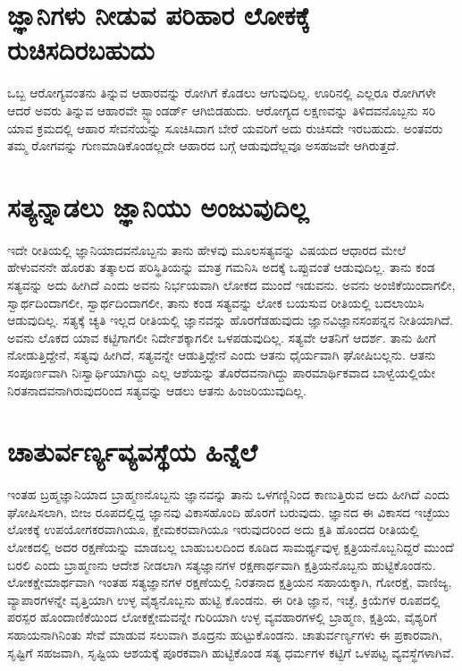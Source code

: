 \section*{ಜ್ಞಾನಿಗಳು ನೀಡುವ ಪರಿಹಾರ ಲೋಕಕ್ಕೆ ರುಚಿಸದಿರಬಹುದು}

ಒಬ್ಬ ಆರೋಗ್ಯವಂತನು ತಿನ್ನುವ ಆಹಾರವನ್ನು ರೋಗಿಗೆ ಕೊಡಲು ಆಗುವುದಿಲ್ಲ. ಊರಿನಲ್ಲಿ ಎಲ್ಲರೂ ರೋಗಿಗಳೇ ಆದರೆ ಅವರು ತಿನ್ನುವ ಆಹಾರವೇ ಸ್ಟ್ಯಾಂಡರ್ಡ್ ಆಗಿಬಿಡಹುದು. ಆರೋಗ್ಯದ ಲಕ್ಷಣವನ್ನು ತಿಳಿದವನೊಬ್ಬನು ಸರಿ ಯಾವ ಕ್ರಮದಲ್ಲಿ ಆಹಾರ ಸೇವನೆಯನ್ನು ಸೂಚಿಸಿದಾಗ ಬೇರೆ ಯವರಿಗೆ ಅದು ರುಚಿಸದೇ ಇರಬಹುದು. ಅಂತವರು ತಮ್ಮ ರೋಗವನ್ನು ಗುಣಮಾಡಿಕೊಂಡಲ್ಲದೇ ಆಹಾರದ ಬಗ್ಗೆ ಆಡುವುದೆಲ್ಲವೂ ಅಸಹಜವೇ ಆಗಿರುತ್ತದೆ.

\section*{ಸತ್ಯನ್ನಾಡಲು ಜ್ಞಾನಿಯು ಅಂಜುವುದಿಲ್ಲ}

ಇದೇ ರೀತಿಯಲ್ಲಿ ಜ್ಞಾನಿಯಾದವನೊಬ್ಬನು ತಾನು ಹೇಳವು ಮೂಲಸತ್ಯವನ್ನು ವಿಷಯದ ಆಧಾರದ ಮೇಲೆ ಹೇಳುವನನೇ ಹೊರತು ತತ್ಕಾಲದ ಪರಿಸ್ಥಿತಿಯನ್ನು ಮಾತ್ರ ಗಮನಿಸಿ ಅದಕ್ಕೆ ಒಪ್ಪುವಂತೆ ಆಡುವುದಿಲ್ಲ. ತಾನು ಕಂಡ ಸತ್ಯವನ್ನು ಅದು ಹೀಗಿದೆ ಎಂದು ಅವನು ನಿರ್ಭಯವಾಗಿ ಲೋಕದ ಮುಂದೆ ಇಡುವನು. ಅವನು ಅಂಜಿಕೆಯಿಂದಾಗಲೀ, ಸ್ವಾರ್ಥದಿಂದಾಗಲೀ, ಸ್ವಾರ್ಥದಿಂದಾಗಲೀ, ತಾನು ಕಂಡ ಸತ್ಯವನ್ನು ಲೋಕ ಬಯಸುವ ರೀತಿಯಲ್ಲಿ ಬದಲಾಯಿಸಿ ಆಡುವುದಿಲ್ಲ. ಸತ್ಯಕ್ಕೆ ಚ್ಯತಿ ಇಲ್ಲದ ರೀತಿಯಲ್ಲಿ ಜ್ಞಾನವನ್ನು ಹೊರಗೆಡಹುವುದು ಜ್ಞಾನವಿಜ್ಞಾನಸಂಪನ್ನನ ನೀತಿಯಾಗಿದೆ. ಅವನು ಲೊಕದ ಯಾವ ಕಟ್ಟಿಗಾಗಲೀ ನಿರ್ದೇಶಕ್ಕಾಗಲೀ ಒಳಪಡುವುದಿಲ್ಲ. ಸತ್ಯವೇ ಆತನಿಗೆ ಆದರ್ಶ. ತಾನು ಹೀಗೆ ನೋಡುತ್ತಿದ್ದೇನೆ, ಸತ್ಯವು ಹೀಗಿದೆ, ಸತ್ಯವನ್ನೇ ಆಡುತ್ತಿದ್ದೇನೆ ಎಂದು ಆತನು ಧೈರ್ಯವಾಗಿ ಘೋಷಿಬಲ್ಲನು. ಆತನು ಸಂಪೂರ್ಣವಾಗಿ ನಿಃಸ್ವಾರ್ಥಿಯಾಗಿದ್ದು ಎಲ್ಲ ಆಶೆಯನ್ನು ತೊರೆದವನಾಗಿದ್ದು ಪಾರಮಾರ್ಥಿಕವಾದ ಬಾಳ್ವೆಯಲ್ಲಿಯೇ ನಿರತನಾದವನಾಗಿರುವುದರಿಂದ ಸತ್ಯವನ್ನು ಆಡಲು ಆತನು ಹಿಂಜರಿಯುವುದಿಲ್ಲ. 

\section*{ಚಾತುರ್ವರ್ಣ್ಯವ್ಯವಸ್ಥೆಯ ಹಿನ್ನೆಲೆ}

ಇಂತಹ ಬ್ರಹ್ಮಜ್ಞಾನಿಯಾದ ಬ್ರಾಹ್ಮಣನೊಬ್ಬನು ಜ್ಞಾನವನ್ನು ತಾನು ಒಳಗಣ್ಣಿನಿಂದ ಕಾಣುತ್ತಿರುವ ಅದು ಹೀಗಿದೆ ಎಂದು ಘೋಷಿಸಲಾಗಿ, ಬೀಜ ರೂಪದಲ್ಲಿದ್ದ ಜ್ಞಾನವು ವಿಕಾಸಹೊಂದಿ ಹೊರಗೆ ಬರುವುದು. ಜ್ಞಾನದ ಈ ವಿಕಾಸದ ಇಚ್ಛೆಯು ಲೋಕಕ್ಕೆ ಉಪಯೋಗಕರವಾಗಿಯೂ, ಕ್ಷೇಮಕರವಾಗಿಯೂ ಇರುವುದರಿಂದ ಅದು ಕ್ಷತಿ ಹೊಂದದ ರೀತಿಯಲ್ಲಿ ಲೋಕದಲ್ಲಿ ಅದರ ರಕ್ಷಣೆಯನ್ನು ಮಾಡಬಲ್ಲ ಬಾಹುಬಲದಿಂದ ಕೂಡಿದ ಸಾಮರ್ಥ್ಯವುಳ್ಳ ಕ್ಷತ್ರಿಯನೊಬ್ಬನಿದ್ದರೆ ಮುಂದೆ ಬರಲಿ ಎಂದು ಬ್ರಾಹ್ಮಣನು ಆದೇಶ ನೀಡಲಾಗಿ ಸತ್ಯಜ್ಞಾನಗಳ ರಕ್ಷಣಾರ್ಥವಾಗಿ ಕ್ಷತ್ರಿಯನೊಬ್ಬನು ಹುಟ್ಟಿಕೊಂಡನು. ಲೋಕಕ್ಷೇಮಾರ್ಥವಾಗಿ ಇಂತಹ ಸತ್ಯಜ್ಞಾನಗಳ ರಕ್ಷಣೆಯಲ್ಲಿ ನಿರತನಾದ ಕ್ಷತ್ರಿಯನ ಸಹಾಯಕ್ಕಾಗಿ, ಗೋರಕ್ಷೆ, ವಾಣಿಜ್ಯ, ವ್ಯಾಪಾರಗಳನ್ನೇ ವೃತ್ತಿಯಾಗಿ ಉಳ್ಳ ವೈಶ್ಯನೊಬ್ಬನು ಹುಟ್ಟಿ ಕೊಂಡನು. ಈ ರೀತಿ ಜ್ಞಾನ, ಇಚ್ಛೆ, ಕ್ರಿಯೆಗಳ ರೂಪದಲ್ಲಿ ಪರಸ್ಪರ ಹೊಂದಾಣಿಕೆಯಿಂದ ಲೋಕಕ್ಷೇಮವನ್ನೇ ಗುರಿಯಾಗಿ ಉಳ್ಳ ವ್ಯವಹಾರಗಳಲ್ಲಿ ಬ್ರಾಹ್ಮಣ, ಕ್ಷತ್ರಿಯ, ವೈಶ್ಯರಿಗೆ ಸಹಾಯನಾಗಿನಿಂತು ಸೇವೆ ಮಾಡುವ ಸಲುವಾಗಿ ಶೂದ್ರನು ಹುಟ್ಟುಕೊಂಡನು. ಚಾತುರ್ವರ್ಣ್ಯಗಳು ಈ ಪ್ರಕಾರವಾಗಿ, ಸೃಷ್ಟಿಗೆ ಸಹಜವಾಗಿ, ಸೃಷ್ಟಿಯ ಆಶಯಕ್ಕೆ ಪೂರಕವಾಗಿ ಹುಟ್ಟಿಕೊಂಡ ಸತ್ಯ ಧರ್ಮಗಳ ಕಟ್ಟಿಗೆ ಒಳಪಟ್ಟ ವ್ಯವಸ್ಥೆಗಳಾಗಿವೆ.

